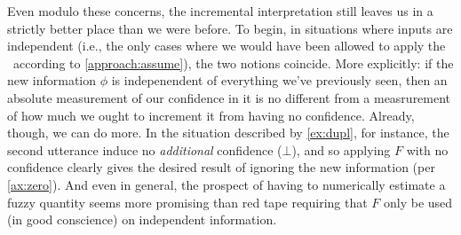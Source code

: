 \begin{enumerate}[label={\textbf{I\arabic*.}},ref={I\arabic*}]
	Even modulo these concerns, the incremental interpretation still leaves us in a strictly better place than we were before.
	To begin, in situations where inputs are independent (i.e., the only cases where we would have been allowed to apply the \cofunc\ according to \cref{approach:assume}), the two notions coincide.
	More explicitly: if the new information $\phi$ is indepenendent of everything we've previously seen, then an absolute measurement of our confidence in it is no different from a measrurement of how much we ought to increment it from having no confidence.
	Already, though, we can do more.
	In the situation described by \cref{ex:dupl}, for instance,
	the second utterance induce no \emph{additional} confidence ($\bot$), and so applying $F$ with no confidence clearly gives the desired result of ignoring the new information (per \cref{ax:zero}).
%
%
	And even in general, the prospect of having to numerically estimate a fuzzy quantity seems more promising than red tape requiring that $F$ only be used (in good conscience) on independent information.

\end{enumerate}




